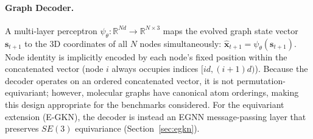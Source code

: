 \documentclass{article}
\newcommand{\x}{\mathbf{x}}
\newcommand{\R}{\mathbb{R}}
\begin{document}
\paragraph{Graph Decoder.}
A multi-layer perceptron $\psi_\theta: \R^{Nd} \to \R^{N \times 3}$ maps the evolved graph state vector $\mathbf{s}_{t+1}$ to the 3D coordinates of all $N$ nodes simultaneously: $\hat{\x}_{t+1} = \psi_\theta(\mathbf{s}_{t+1})$. Node identity is implicitly encoded by each node's fixed position within the concatenated vector (node $i$ always occupies indices $[id, (i{+}1)d)$). Because the decoder operates on an ordered concatenated vector, it is not permutation-equivariant; however, molecular graphs have canonical atom orderings, making this design appropriate for the benchmarks considered. For the equivariant extension (E-GKN), the decoder is instead an EGNN message-passing layer that preserves $SE(3)$ equivariance (Section~\ref{sec:egkn}).
\end{document}
